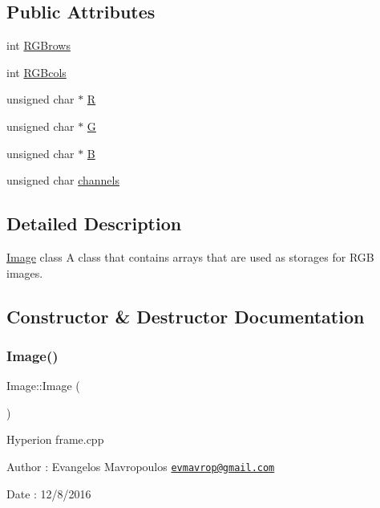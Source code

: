 \subsection*{Public Attributes}
\begin{DoxyCompactItemize}
\item 
int \mbox{\hyperlink{classImage_a889c1999ea31650f1337ba4c349a9d69}{R\+G\+Brows}}
\item 
int \mbox{\hyperlink{classImage_a83e180c07c91e9bc194e52f962a3edd3}{R\+G\+Bcols}}
\item 
unsigned char $\ast$ \mbox{\hyperlink{classImage_a7792d25cb1b88da78b52994d25e66c50}{R}}
\item 
unsigned char $\ast$ \mbox{\hyperlink{classImage_a6678f22311b545bb530a9138d3639bdd}{G}}
\item 
unsigned char $\ast$ \mbox{\hyperlink{classImage_a360ce541c19a88fef24a08cbebceeac5}{B}}
\item 
unsigned char \mbox{\hyperlink{classImage_a1cbaf48be2c575a75bd06d624ba91b41}{channels}}
\end{DoxyCompactItemize}


\subsection{Detailed Description}
\mbox{\hyperlink{classImage}{Image}} class A class that contains arrays that are used as storages for R\+GB images. 

\subsection{Constructor \& Destructor Documentation}
\mbox{\label{classImage_a58edd1c45b4faeb5f789b0d036d02313}} 
\subsubsection{\texorpdfstring{Image()}{Image()}\hspace{0.1cm}{\footnotesize\ttfamily [1/5]}}
{\footnotesize\ttfamily Image\+::\+Image (\begin{DoxyParamCaption}{ }\end{DoxyParamCaption})}

Hyperion frame.\+cpp

\begin{DoxyAuthor}{Author}
\+: Evangelos Mavropoulos \href{mailto:evmavrop@gmail.com}{\tt evmavrop@gmail.\+com} 
\end{DoxyAuthor}
\begin{DoxyDate}{Date}
\+: 12/8/2016 
\end{DoxyDate}
\mbox{\label{classImage_adc39a6501723c1f780b60ad9893f9c4b}} 
